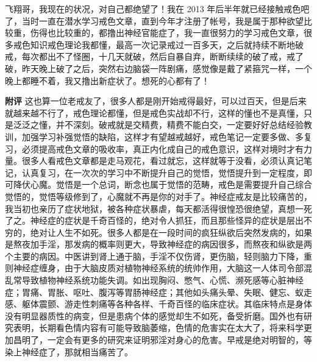 \begin{case}
    飞翔哥，我现在的状况，对自己都绝望了！我在 2013 年后半年就已经接触戒色吧了，当时一直在潜水学习戒色文章，直到今年才注册了帐号，我是属于那种欲望比较重，伤得也比较重的，都撸出神经官能症了，我一直很努力的学习戒色文章，很多戒色知识戒色理论我都懂，最高一次记录戒过一百多天，之后就持续不断地破戒，每次都出不了怪圈，十几天就破，然后自暴自弃，断断续续的破了戒，戒了破，昨天晚上破了之后，突然右边脑袋一阵剧痛，感觉像是戴了紧箍咒一样，一个晚上都睡不着，我又撸出新症状了。想死的心都有了！

    \textbf{附评} 这也算一位老戒友了，很多人都是刚开始戒得最好，可以过百天，但是后来就越来越不行了，戒色理论都懂，但是戒色实战却不行，这样的懂也不是真懂，只是泛泛之懂，并不深刻。破戒就是交精费，精费不能白交，一定要好好总结经验教训，加强学习补强觉悟的缺陷，这样才有望越戒越好，戒色笔记一定要多做、多复习，必须提高戒色文章的吸收率，真正内化成自己的戒色意识，这样对境时才有力量。很多人看戒色文章都是走马观花，看过就忘，这样就等于没看，必须认真记笔记，认真复习，在一次次的学习中不断提升自己的觉悟，觉悟提升到一定程度，即可降伏心魔。觉悟是一个总词，断念也属于觉悟的范畴，戒色是需要提升自己综合觉悟的，觉悟等级修到了，心魔就不再是你的对手了。神经症戒友是比较痛苦的，我当初也亲历了症状地狱，被各种症状暴虐，每天都活得很惶恐很绝望，真想一死了之。神经症的症状是千奇百怪的，绝对令人抓狂，而且那些怪异的症状是层出不穷的，绝对让人生不如死。很多人都是在一段时间的疯狂纵欲后突然发病的，如果是熬夜加手淫，那发病的概率则更大，导致神经症的病因很多，而熬夜和纵欲是两个主要的病因。中医讲到肾上通于脑，手淫不仅伤肾，更伤脑，轻则脑力下降，重则神经症缠身，由于大脑皮质对植物神经系统的统帅作用，大脑这一人体司令部混乱常导致植物神经系统功能失调。如出现胸闷、憋气、心慌、濒死感等心脏神经症；胃痛、胃胀、呕吐、腹泻等胃肠神经症；其他如头痛头晕、失眠、健忘、蚁走感、躯体震颤、游走性刺痛等各种各样、千奇百怪的临床症状。其临床特点是身体没有明显器质性的病变，但是患病个体的感觉却生不如死，备受折磨。国外也有研究表明，长期看色情内容有可能导致脑萎缩，色情的危害实在太大了，将来科学更加昌明了，一定会有更多的研究来证明邪淫对身心的危害。早戒是绝对明智的，等染上神经症了，那就相当痛苦了。
\end{case}

